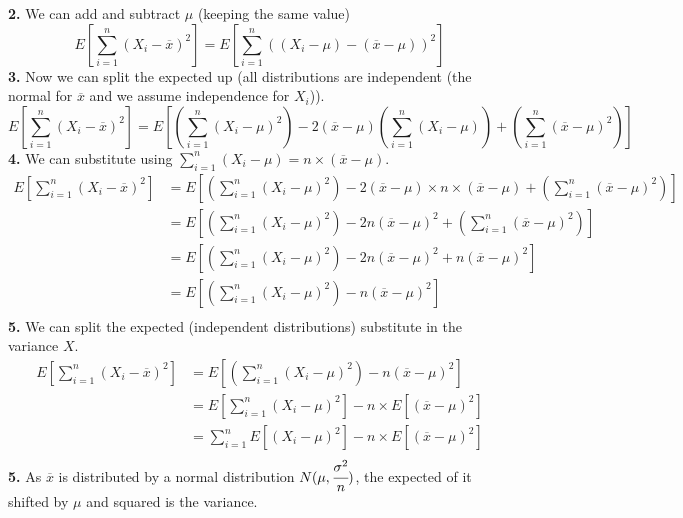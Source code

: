 \documentclass{report}
\begin{document}
            \textbf{2. } We can add and subtract $\mu$ (keeping the same value)
            \[E\left[ \sum_{i = 1}^n ( X_i - \overline{x} )^2 \right] = E\left[ \sum_{i = 1}^n ( (X_i - \mu) - (\overline{x} - \mu) )^2 \right]\]
            \textbf{3. } Now we can split the expected up (all distributions are independent (the normal for $\overline{x}$ and we assume independence for $X_i$)).
            \[E\left[ \sum_{i = 1}^n ( X_i - \overline{x} )^2 \right] = E\left[ \left( \sum_{i = 1}^n (X_i - \mu)^2 \right) - 2(\overline{x} - \mu)\left( \sum_{i = 1}^n (X_i - \mu) \right) + \left( \sum_{i = 1}^n(\overline{x} - \mu)^2 \right) \right]\]
            \textbf{4. } We can substitute using $\sum_{i = 1}^n (X_i - \mu) = n \times (\overline{x} - \mu)$.
            \[\begin{split}
                E\left[ \sum_{i = 1}^n ( X_i - \overline{x} )^2 \right] &= E\left[ \left( \sum_{i = 1}^n (X_i - \mu)^2 \right) - 2(\overline{x} - \mu) \times n \times (\overline{x} - \mu) + \left( \sum_{i = 1}^n(\overline{x} - \mu)^2 \right) \right] \\
                &= E\left[ \left( \sum_{i = 1}^n (X_i - \mu)^2 \right) - 2n(\overline{x} - \mu)^2 + \left( \sum_{i = 1}^n(\overline{x} - \mu)^2 \right) \right] \\
                &= E\left[ \left( \sum_{i = 1}^n (X_i - \mu)^2 \right) - 2n(\overline{x} - \mu)^2 + n(\overline{x} - \mu)^2 \right] \\
                &= E\left[ \left( \sum_{i = 1}^n (X_i - \mu)^2 \right) - n(\overline{x} - \mu)^2 \right] \\
            \end{split}\]
            \textbf{5. } We can split the expected (independent distributions) substitute in the variance $X$.
            \[\begin{split}
                E\left[ \sum_{i = 1}^n ( X_i - \overline{x} )^2 \right] &= E\left[ \left( \sum_{i = 1}^n (X_i - \mu)^2 \right) - n(\overline{x} - \mu)^2 \right] \\
                &= E \left[ \sum_{i = 1}^n (X_i - \mu)^2 \right] - n \times E\left[ \left( \overline{x} - \mu \right)^2 \right]\\
                &= \sum_{i = 1}^n E\left[ (X_i - \mu)^2 \right] - n \times E\left[ \left( \overline{x} - \mu \right)^2 \right]\\
            \end{split}\]
            \textbf{5. } As $\overline{x}$ is distributed by a normal distribution $N(\mu, \cfrac{\sigma^2}{n})$, the expected of it shifted by $\mu$ and squared is the variance.
\end{document}

